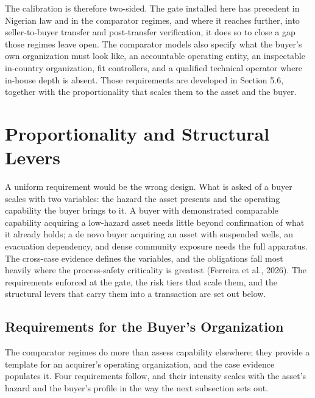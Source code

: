 The calibration is therefore two-sided. The gate installed here has
precedent in Nigerian law and in the comparator regimes, and where it
reaches further, into seller-to-buyer transfer and post-transfer
verification, it does so to close a gap those regimes leave open. The
comparator models also specify what the buyer's own organization must
look like, an accountable operating entity, an inspectable in-country
organization, fit controllers, and a qualified technical operator where
in-house depth is absent. Those requirements are developed in Section
5.6, together with the proportionality that scales them to the asset and
the buyer.

\hypertarget{proportionality-and-structural-levers}{%
\section{Proportionality and Structural
Levers}\label{proportionality-and-structural-levers}}

A uniform requirement would be the wrong design. What is asked of a
buyer scales with two variables: the hazard the asset presents and the
operating capability the buyer brings to it. A buyer with demonstrated
comparable capability acquiring a low-hazard asset needs little beyond
confirmation of what it already holds; a de novo buyer acquiring an
asset with suspended wells, an evacuation dependency, and dense
community exposure needs the full apparatus. The cross-case evidence
defines the variables, and the obligations fall most heavily where the
process-safety criticality is greatest (Ferreira et al., 2026). The
requirements enforced at the gate, the risk tiers that scale them, and
the structural levers that carry them into a transaction are set out
below.

\hypertarget{requirements-for-the-buyers-organization}{%
\subsection{Requirements for the Buyer's
Organization}\label{requirements-for-the-buyers-organization}}

The comparator regimes do more than assess capability elsewhere; they
provide a template for an acquirer's operating organization, and the
case evidence populates it. Four requirements follow, and their
intensity scales with the asset's hazard and the buyer's profile in the
way the next subsection sets out.

